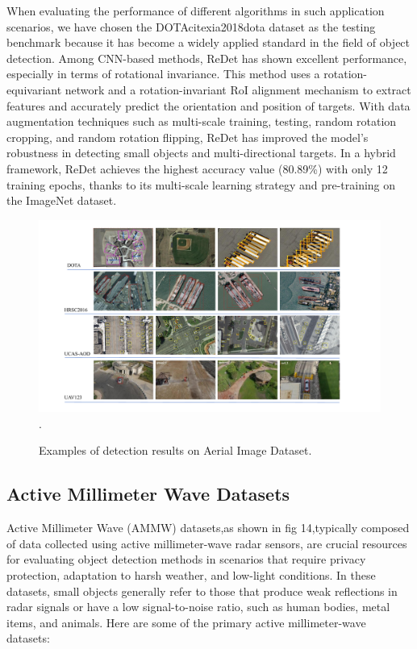 \documentclass[journal]{IEEEtran}
\begin{document}
When evaluating the performance of different algorithms in such application scenarios, we have chosen the DOTAcite{xia2018dota} dataset as the testing benchmark because it has become a widely applied standard in the field of object detection. Among CNN-based methods, ReDet\cite{han2021redet} has shown excellent performance, especially in terms of rotational invariance. This method uses a rotation-equivariant network and a rotation-invariant RoI alignment mechanism to extract features and accurately predict the orientation and position of targets. With data augmentation techniques such as multi-scale training, testing, random rotation cropping, and random rotation flipping, ReDet has improved the model’s robustness in detecting small objects and multi-directional targets. In a hybrid framework, ReDet achieves the highest accuracy value (80.89\%) with only 12 training epochs, thanks to its multi-scale learning strategy and pre-training on the ImageNet dataset.

\begin{figure}[htbp]
	\centering
	\setlength{\abovecaptionskip}{-0.6cm}
	\includegraphics[width=\textwidth]{fig 13}
	\DeclareGraphicsExtensions.
	\caption{Examples of detection results on Aerial Image Dataset.}
	\label{fig 1}
\end{figure}

\subsection{Active Millimeter Wave Datasets}

Active Millimeter Wave (AMMW) datasets,as shown in fig 14,typically composed of data collected using active millimeter-wave radar sensors, are crucial resources for evaluating object detection methods in scenarios that require privacy protection, adaptation to harsh weather, and low-light conditions. In these datasets, small objects generally refer to those that produce weak reflections in radar signals or have a low signal-to-noise ratio, such as human bodies, metal items, and animals. Here are some of the primary active millimeter-wave datasets:
\end{document}
